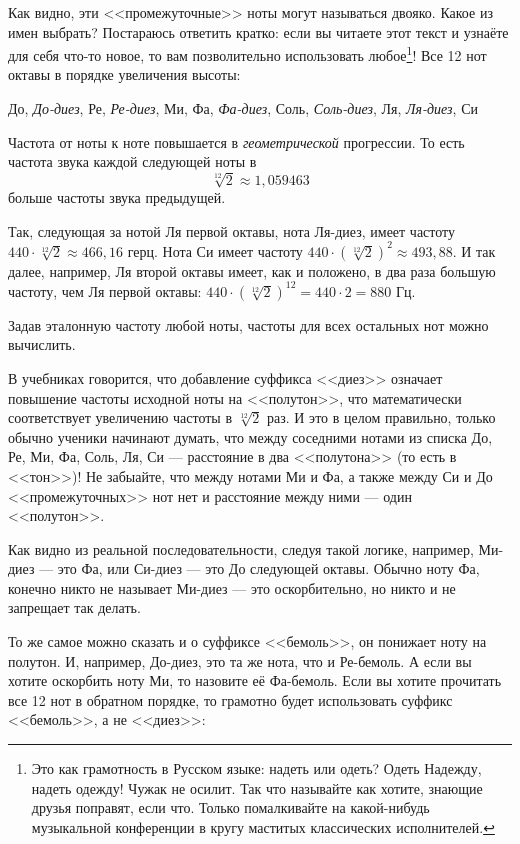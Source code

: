 Как видно, эти <<промежуточные>> ноты могут называться двояко. Какое из имен выбрать? Постараюсь ответить кратко: если вы читаете этот текст и узнаёте для себя что-то новое, то вам позволительно использовать любое\footnote{Это как грамотность в Русском языке: надеть или одеть? Одеть Надежду, надеть одежду! Чужак не осилит. Так что называйте как хотите, знающие друзья поправят, если что. Только помалкивайте на какой-нибудь музыкальной конференции в кругу маститых классических исполнителей.}! Все 12 нот октавы в порядке увеличения высоты:
\begin{center}
    До, \emph{До-диез}, Ре, \emph{Ре-диез}, Ми, Фа, \emph{Фа-диез}, Соль, \emph{Соль-диез}, Ля, \emph{Ля-диез}, Си
\end{center}

Частота от ноты к ноте повышается в \emph{геометрической} прогрессии. То есть частота звука каждой следующей ноты в \[\sqrt[12]{2}\approx 1,059463\] больше частоты звука предыдущей. 

Так, следующая за нотой Ля первой октавы, нота Ля-диез, имеет частоту $440\cdot\sqrt[12]{2}\approx 466,16$ герц. Нота Си имеет частоту $440\cdot(\sqrt[12]{2})^2\approx 493,88$. И так далее, например, Ля второй октавы имеет, как и положено, в два раза большую частоту, чем Ля первой октавы: $440\cdot(\sqrt[12]{2})^{12}=440\cdot 2=880$ Гц.

Задав эталонную частоту любой ноты, частоты для всех остальных нот можно вычислить.

В учебниках говорится, что добавление суффикса <<диез>> означает повышение частоты исходной ноты на <<полутон>>, что математически соответствует увеличению частоты в $\sqrt[12]{2}$ раз. И это в целом правильно, только обычно ученики начинают думать, что между соседними нотами из списка До, Ре, Ми, Фа, Соль, Ля, Си --- расстояние в два <<полутона>> (то есть в <<тон>>)! Не забыайте, что между нотами Ми и Фа, а также между Си и До <<промежуточных>> нот нет и расстояние между ними --- один <<полутон>>. 

Как видно из реальной последовательности, следуя такой логике, например, Ми-диез --- это Фа, или Си-диез --- это До следующей октавы. Обычно ноту Фа, конечно никто не называет Ми-диез --- это оскорбительно, но никто и не запрещает так делать. 

То же самое можно сказать и о суффиксе <<бемоль>>, он понижает ноту на полутон. И, например, До-диез, это та же нота, что и Ре-бемоль. А если вы хотите оскорбить ноту Ми, то назовите её Фа-бемоль. Если вы хотите прочитать все 12 нот в обратном порядке, то грамотно будет использовать суффикс <<бемоль>>, а не <<диез>>:


